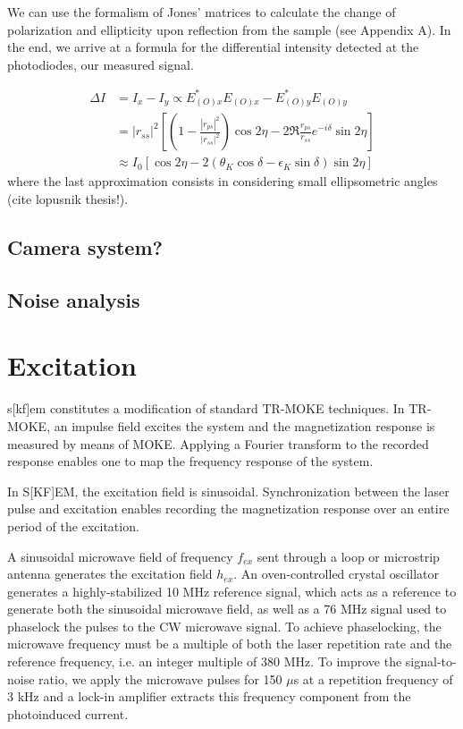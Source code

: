 \documentclass{article}
\begin{document}
We can use the formalism of Jones' matrices to calculate the change of polarization and ellipticity upon reflection from the sample (see Appendix A). In the end, we arrive at a formula for the differential intensity detected at the photodiodes, our measured signal.

\begin{align}
\Delta I &= I_{x} - I_{y} \propto E_{(O)x}^* E_{(O)x} - E_{(O)y}^* E_{(O)y} \\
&= |r_{ss}|^2 \left[ \left(1 - \frac{|r_{ps}|^2}{|r_{ss}|^2}\right) \cos{2 \eta} - 2 \Re{\frac{r_{ps}}{r_{ss}}} e^{-i \delta} \sin{2 \eta} \right] \\
&\approx I_{0} [\cos{2 \eta} - 2(\theta_{K} \cos{\delta} - \epsilon_{K} \sin{\delta}) \sin{2 \eta}]
\end{align}
where the last approximation consists in considering small ellipsometric angles (cite lopusnik thesis!).

\subsection{Camera system?}

\subsection{Noise analysis}

\section{Excitation}
s[kf]em constitutes a modification of standard TR-MOKE techniques. In TR-MOKE, an impulse field excites the system and the magnetization response is measured by means of MOKE. Applying a Fourier transform to the recorded response enables one to map the frequency response of the system.

In S[KF]EM, the excitation field is sinusoidal. Synchronization between the laser pulse and excitation enables recording the magnetization response over an entire period of the excitation. 

A sinusoidal microwave field of frequency $f_{ex}$ sent through a loop or microstrip antenna generates the excitation field $h_{ex}$. An oven-controlled crystal oscillator generates a highly-stabilized 10 MHz reference signal, which acts as a reference to generate both the sinusoidal microwave field, as well as a 76 MHz signal used to phaselock the pulses to the CW microwave signal. To achieve phaselocking, the microwave frequency must be a multiple of both the laser repetition rate and the reference frequency, i.e. an integer multiple of 380 MHz. To improve the signal-to-noise ratio, we apply the microwave pulses for 150 $\mu$s at a repetition frequency of 3 kHz and a lock-in amplifier extracts this frequency component from the photoinduced current.
\end{document}
